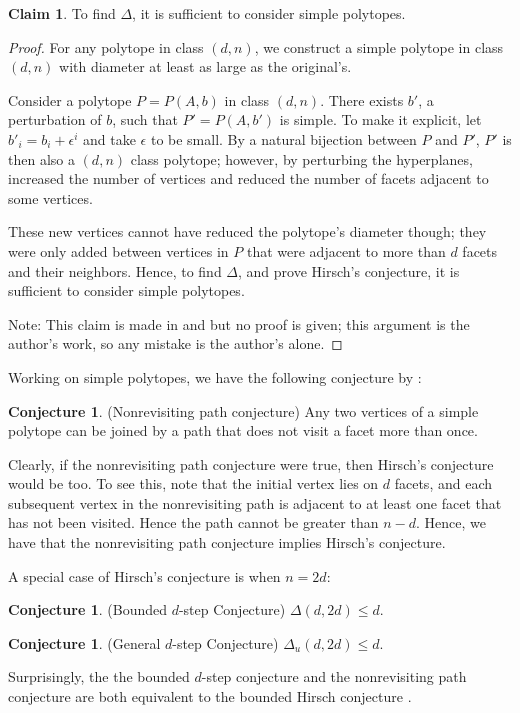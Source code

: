 \documentclass[11pt,a4paper]{article}
\theoremstyle{definition}
\newtheorem{conj}[thm]{Conjecture}
\newtheorem{claim}[thm]{Claim}
\begin{document}
\begin{claim}To find $\Delta$, it is sufficient to consider simple polytopes.
\end{claim}
\begin{proof}
For any polytope in class $(d,n)$, we construct a simple polytope in class $(d,n)$ with diameter at least as large as the original's.

Consider a polytope $P=P(A,b)$ in class $(d,n)$. There exists $b'$, a perturbation of $b$, such that $P'=P(A,b')$ is simple. To make it explicit, let $b'_i=b_i+\epsilon^i$ and take $\epsilon$ to be small. By a natural bijection between $P$ and $P'$, $P'$ is then also a $(d,n)$ class polytope; however, by perturbing the hyperplanes, increased the number of vertices and reduced the number of facets adjacent to some vertices.

These new vertices cannot have reduced the polytope's diameter though; they were only added between vertices in $P$ that were adjacent to more than $d$ facets and their neighbors. Hence, to find $\Delta$, and prove Hirsch's conjecture, it is sufficient to consider simple polytopes.

Note: This claim is made in \citet{klee67} and \citet{zieg94} but no proof is given; this argument is the author's work, so any mistake is the author's alone.
\end{proof}
Working on simple polytopes, we have the following conjecture by \citet{klee65}:
\begin{conj}
	(Nonrevisiting path conjecture) Any two vertices of a simple polytope can be joined by a path that does not visit a facet more than once.
\end{conj}
Clearly, if the nonrevisiting path conjecture were true, then Hirsch's conjecture would be too. To see this, note that the initial vertex lies on $d$ facets, and each subsequent vertex in the nonrevisiting path is adjacent to at least one facet that has not been visited. Hence the path cannot be greater than $n-d$. Hence, we have that the nonrevisiting path conjecture implies Hirsch's conjecture.

A special case of Hirsch's conjecture is when $n=2d$:
\begin{conj}
	(Bounded $d$-step Conjecture) $\Delta(d,2d)\le d$.
\end{conj}
\begin{conj}
	(General $d$-step Conjecture) $\Delta_u(d,2d)\le d$.
\end{conj}
Surprisingly, the the bounded $d$-step conjecture and the nonrevisiting path conjecture are both equivalent to the bounded Hirsch conjecture \citep{klee67}.
\end{document}
